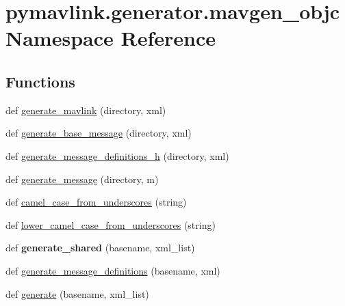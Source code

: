 \hypertarget{namespacepymavlink_1_1generator_1_1mavgen__objc}{}\section{pymavlink.\+generator.\+mavgen\+\_\+objc Namespace Reference}
\label{namespacepymavlink_1_1generator_1_1mavgen__objc}
\subsection*{Functions}
\begin{DoxyCompactItemize}
\item 
def \hyperlink{namespacepymavlink_1_1generator_1_1mavgen__objc_a029723100a1cc0db78017c05edbc66a9}{generate\+\_\+mavlink} (directory, xml)
\item 
def \hyperlink{namespacepymavlink_1_1generator_1_1mavgen__objc_a62689e6ef17a3f47ebe23fdb19258f4b}{generate\+\_\+base\+\_\+message} (directory, xml)
\item 
def \hyperlink{namespacepymavlink_1_1generator_1_1mavgen__objc_a2cf69803028e8d4f40edf1eeb561f996}{generate\+\_\+message\+\_\+definitions\+\_\+h} (directory, xml)
\item 
def \hyperlink{namespacepymavlink_1_1generator_1_1mavgen__objc_ab9050e3458fe8e9f6cc2210a66bd2b83}{generate\+\_\+message} (directory, m)
\item 
def \hyperlink{namespacepymavlink_1_1generator_1_1mavgen__objc_aadc6040b4b644298ef796c16cdabb42c}{camel\+\_\+case\+\_\+from\+\_\+underscores} (string)
\item 
def \hyperlink{namespacepymavlink_1_1generator_1_1mavgen__objc_ad0ae2d39d1f7d12c1178449325199d2d}{lower\+\_\+camel\+\_\+case\+\_\+from\+\_\+underscores} (string)
\item 
\mbox{\label{namespacepymavlink_1_1generator_1_1mavgen__objc_a677ef15fb3fb65545a5a589e513b7fe4}} 
def {\bfseries generate\+\_\+shared} (basename, xml\+\_\+list)
\item 
def \hyperlink{namespacepymavlink_1_1generator_1_1mavgen__objc_a0976eb9b9b1af74699e2a1ecf5fef706}{generate\+\_\+message\+\_\+definitions} (basename, xml)
\item 
def \hyperlink{namespacepymavlink_1_1generator_1_1mavgen__objc_a2a6922cc4a5527ce0746314515c76438}{generate} (basename, xml\+\_\+list)
\end{DoxyCompactItemize}
